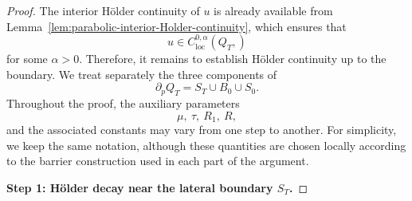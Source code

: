 \documentclass[final,onefignum,onetabnum]{mousaviart}
\begin{document}
	
	\begin{proof}
		The interior Hölder continuity of $u$ is already available from Lemma~\ref{lem:parabolic-interior-Holder-continuity}, which ensures that
		\[
		u \in C^{0, \alpha}_{\text{loc}}(Q_T,)
		\]
		for some $\alpha>0$.
		Therefore, it remains to establish Hölder continuity up to the boundary. We treat separately the three components of
		\[
		\partial_p Q_T
		=
		S_T \cup B_0 \cup S_0.
		\]
		Throughout the proof, the auxiliary parameters
		\[
		\mu,\ \tau,\ R_1,\ R,
		\]
		and the associated constants may vary from one step to another. For simplicity, we keep the same notation, although these quantities are chosen locally according to the barrier construction used in each part of the argument.
		
		\noindent
		{\bf Step 1: Hölder decay near the lateral boundary \(S_T\).}
		

\end{proof}
\end{document}

